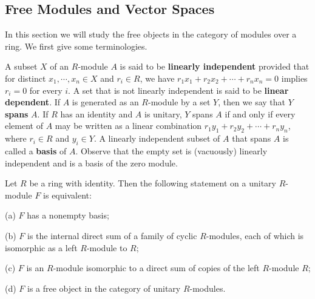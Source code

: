 \subsection{Free Modules and Vector Spaces}
In this section we will study the free objects in the category of modules over a ring. We first give some terminologies.\par
A subset $X$ of an $R$-module $A$ is said to be \textbf{linearly independent} provided that for distinct $x_1,\cdots,x_n\in X$ and $r_i\in R$, we have $r_1x_1+r_2x_2+\cdots+r_nx_n=0$ implies $r_i=0$ for every $i$. A set that is not linearly independent is said to be \textbf{linear dependent}. If $A$ is generated as an $R$-module by a set $Y$, then we say that $Y$ \textbf{spans} $A$. If $R$ has an identity and $A$ is unitary, $Y$ spans $A$ if and only if every element of $A$ may be written as a linear combination $r_1y_1+r_2y_2+\cdots+r_ny_n$, where $r_i\in R$ and $y_i\in Y$. A linearly independent subset of $A$ that spans $A$ is called a \textbf{basis} of $A$. Observe that the empty set is (vacuously) linearly independent and is a basis of the zero module.
\begin{theorem}
Let $R$ be a ring with identity. Then the following statement on a unitary $R$-module $F$ is equivalent:\par
(a) $F$ has a nonempty basis;\par
(b) $F$ is the internal direct sum of a family of cyclic $R$-modules, each of which is isomorphic as a left $R$-module to $R$;\par
(c) $F$ is an $R$-module isomorphic to a direct sum of copies of the left $R$-module $R$;\par
(d) $F$ is a free object in the category of unitary $R$-modules.
\end{theorem}
